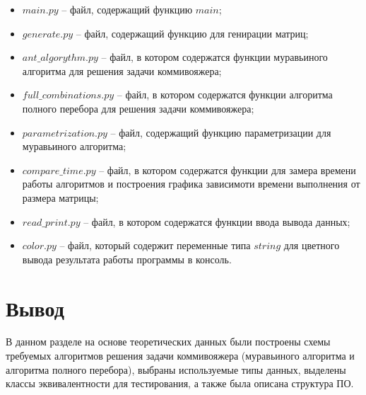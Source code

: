 \begin{itemize}
	\item $main.py$ -- файл, содержащий функцию $main$;
	\item $generate.py$ -- файл, содержащий функцию для генирации матриц;
    \item $ant\_algorythm.py$ -- файл, в котором содержатся функции муравьиного алгоритма для решения задачи коммивояжера;
    \item $full\_combinations.py$ -- файл, в котором содержатся функции алгоритма полного перебора для решения задачи коммивояжера;
    \item $parametrization.py$ -- файл, содержащий функцию параметризации для муравьиного алгоритма;
    \item $compare\_time.py$ -- файл, в котором содержатся функции для замера времени работы алгоритмов и построения графика зависимоти времени выполнения от размера матрицы;
    \item $read\_print.py$ -- файл, в котором содержатся функции ввода вывода данных;
    \item $color.py$ -- файл, который содержит переменные типа $string$ для цветного вывода результата работы программы в консоль.
\end{itemize}

\section{Вывод}

В данном разделе на основе теоретических данных были построены схемы требуемых алгоритмов решения задачи коммивояжера (муравьиного алгоритма и алгоритма полного перебора), выбраны используемые типы данных, выделены классы эквивалентности для тестирования, а также была описана структура ПО.

